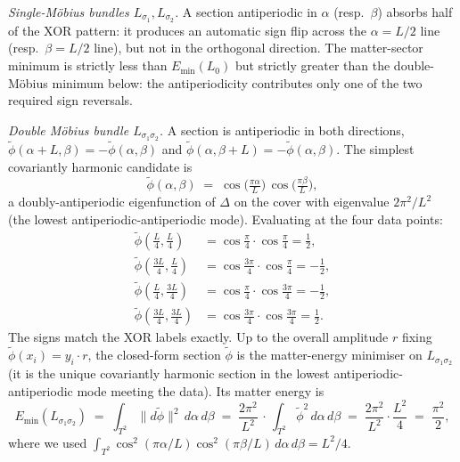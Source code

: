 \emph{Single-M\"obius bundles $L_{\sigma_1}, L_{\sigma_2}$.} A
section antiperiodic in $\alpha$ (resp.\ $\beta$) absorbs half of
the XOR pattern: it produces an automatic sign flip across the
$\alpha=L/2$ line (resp.\ $\beta=L/2$ line), but not in the
orthogonal direction. The matter-sector minimum is strictly less
than $E_{\min}(L_0)$ but strictly greater than the double-M\"obius
minimum below: the antiperiodicity contributes only one of the two
required sign reversals.

\emph{Double M\"obius bundle $L_{\sigma_1\sigma_2}$.} A section is
antiperiodic in both directions, $\tilde\phi(\alpha+L,\beta)=
-\tilde\phi(\alpha,\beta)$ and $\tilde\phi(\alpha,\beta+L)=
-\tilde\phi(\alpha,\beta)$. The simplest covariantly harmonic
candidate is
\[
   \tilde\phi(\alpha,\beta) \;=\;
   \cos\!\bigl(\tfrac{\pi\alpha}{L}\bigr)\,
   \cos\!\bigl(\tfrac{\pi\beta}{L}\bigr),
\]
a doubly-antiperiodic eigenfunction of $\Delta$ on the cover with
eigenvalue $2\pi^2/L^2$ (the lowest antiperiodic-antiperiodic mode).
Evaluating at the four data points:
\begin{align*}
   \tilde\phi(\tfrac{L}{4},\tfrac{L}{4})
   &= \cos\tfrac{\pi}{4}\cdot\cos\tfrac{\pi}{4} = \tfrac{1}{2}, \\
   \tilde\phi(\tfrac{3L}{4},\tfrac{L}{4})
   &= \cos\tfrac{3\pi}{4}\cdot\cos\tfrac{\pi}{4} = -\tfrac{1}{2}, \\
   \tilde\phi(\tfrac{L}{4},\tfrac{3L}{4})
   &= \cos\tfrac{\pi}{4}\cdot\cos\tfrac{3\pi}{4} = -\tfrac{1}{2}, \\
   \tilde\phi(\tfrac{3L}{4},\tfrac{3L}{4})
   &= \cos\tfrac{3\pi}{4}\cdot\cos\tfrac{3\pi}{4} = \tfrac{1}{2}.
\end{align*}
The signs match the XOR labels exactly. Up to the overall
amplitude $r$ fixing $\tilde\phi(x_i)=y_i\cdot r$, the closed-form
section $\tilde\phi$ is the matter-energy minimiser on
$L_{\sigma_1\sigma_2}$ (it is the unique covariantly harmonic
section in the lowest antiperiodic-antiperiodic mode meeting the
data). Its matter energy is
\[
   E_{\min}(L_{\sigma_1\sigma_2}) \;=\;
   \int_{T^2}\|d\tilde\phi\|^2\,d\alpha\,d\beta
   \;=\; \frac{2\pi^2}{L^2}\,\cdot\,
   \int_{T^2}\tilde\phi^2\,d\alpha\,d\beta
   \;=\; \frac{2\pi^2}{L^2}\cdot\frac{L^2}{4}
   \;=\; \frac{\pi^2}{2},
\]
where we used $\int_{T^2}\cos^2(\pi\alpha/L)\cos^2(\pi\beta/L)
\,d\alpha\,d\beta = L^2/4$.

